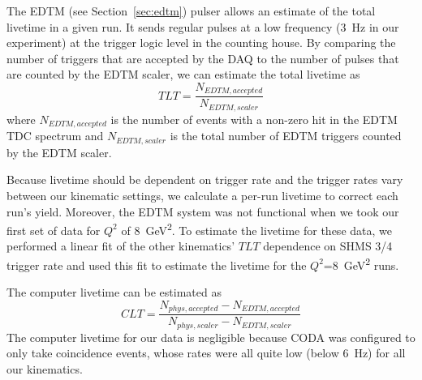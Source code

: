 The EDTM (see Section~\ref{sec:edtm}) pulser allows an estimate of the total
livetime in a given run.
It sends regular pulses at a low frequency (\SI{3}{\hertz} in our experiment) at the
trigger logic level in the counting house.
By comparing the number of triggers that are accepted by the DAQ to the number
of pulses that are counted by the EDTM scaler, we can estimate the total
livetime as
\begin{equation}
    TLT = \frac{N_{EDTM,accepted}}{N_{EDTM,scaler}}
\end{equation}
where $N_{EDTM,accepted}$ is the number of events with a non-zero hit in the
EDTM TDC spectrum and $N_{EDTM,scaler}$ is the total number of EDTM triggers
counted by the EDTM scaler.


Because livetime should be dependent on trigger rate and the trigger rates
vary between our kinematic settings, we calculate a per-run livetime to
correct each run's yield.
Moreover, the EDTM system was not functional when we took our first set of data
for $Q^2$ of \SI{8}{\giga\electronvolt\squared}.
To estimate the livetime for these data, we performed a linear fit of the other
kinematics' $TLT$ dependence on SHMS 3/4 trigger rate and used this fit to
estimate the livetime for the $Q^2$=\SI{8}{\giga\electronvolt\squared} runs.


The computer livetime can be estimated as
\begin{equation}
    CLT = \frac{N_{phys,accepted}-N_{EDTM,accepted}}{N_{phys,scaler}-N_{EDTM,scaler}}
\end{equation}
The computer livetime for our data is negligible because CODA was configured to
only take coincidence events, whose rates were all quite low (below
\SI{6}{\hertz}) for all our kinematics.



